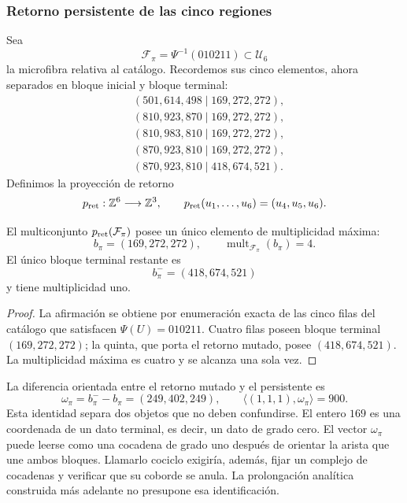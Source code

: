 \subsubsection{Retorno persistente de las cinco regiones}

Sea
\[
\mathcal F_\pi=\Psi^{-1}(010211)\subset\mathcal U_6
\]
la microfibra relativa al catálogo. Recordemos sus cinco elementos, ahora
separados en bloque inicial y bloque terminal:
\[
\begin{aligned}
 &(501,614,498\mid169,272,272),\\
 &(810,923,870\mid169,272,272),\\
 &(810,983,810\mid169,272,272),\\
 &(870,923,810\mid169,272,272),\\
 &(870,923,810\mid418,674,521).
\end{aligned}
\]
Definimos la proyección de retorno
\[
p_{\rm ret}:\mathbb Z^6\longrightarrow\mathbb Z^3,
\qquad
p_{\rm ret}(u_1,\ldots,u_6)=(u_4,u_5,u_6).
\]

\begin{proposition}
\label{p12-83-c13-s3:prop:bloque-terminal-persistente}
El multiconjunto \(p_{\rm ret}(\mathcal F_\pi)\) posee un único elemento de
multiplicidad máxima:
\[
b_\pi=(169,272,272),
\qquad
\operatorname{mult}_{\mathcal F_\pi}(b_\pi)=4.
\]
El único bloque terminal restante es
\[
b_\pi^-=(418,674,521)
\]
y tiene multiplicidad uno.
\end{proposition}

\begin{proof}
La afirmación se obtiene por enumeración exacta de las cinco filas del
catálogo que satisfacen \(\Psi(U)=010211\). Cuatro filas poseen bloque
terminal \((169,272,272)\); la quinta, que porta el retorno mutado, posee
\((418,674,521)\). La multiplicidad máxima es cuatro y se alcanza una sola
vez.
\end{proof}

La diferencia orientada entre el retorno mutado y el persistente es
\[
 \omega_\pi=b_\pi^- - b_\pi=(249,402,249),
 \qquad
 \langle(1,1,1),\omega_\pi\rangle=900.
\]
Esta identidad separa dos objetos que no deben confundirse. El entero
\(169\) es una coordenada de un dato terminal, es decir, un dato de grado
cero. El vector \(\omega_\pi\) puede leerse como una cocadena de grado uno
después de orientar la arista que une ambos bloques. Llamarlo cociclo exigiría,
además, fijar un complejo de cocadenas y verificar que su coborde se anula.
La prolongación analítica construida más adelante no presupone esa
identificación.

